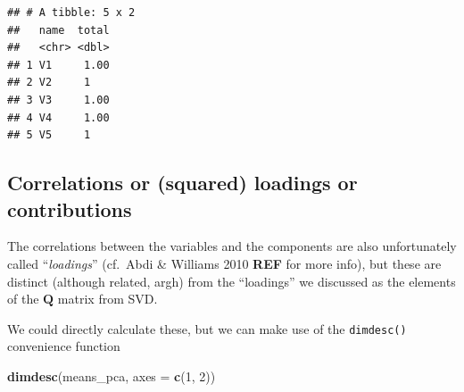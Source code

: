 \documentclass[
]{book}
\newenvironment{Shaded}{\begin{snugshade}}{\end{snugshade}}
\newcommand{\AttributeTok}[1]{\textcolor[rgb]{0.13,0.29,0.53}{#1}}
\newcommand{\CommentTok}[1]{\textcolor[rgb]{0.56,0.35,0.01}{\textit{#1}}}
\newcommand{\DecValTok}[1]{\textcolor[rgb]{0.00,0.00,0.81}{#1}}
\newcommand{\FunctionTok}[1]{\textcolor[rgb]{0.13,0.29,0.53}{\textbf{#1}}}
\newcommand{\NormalTok}[1]{#1}
\newcommand{\SpecialCharTok}[1]{\textcolor[rgb]{0.81,0.36,0.00}{\textbf{#1}}}
\begin{document}
\begin{Shaded}
\end{Shaded}

\begin{verbatim}
## # A tibble: 5 x 2
##   name  total
##   <chr> <dbl>
## 1 V1     1.00
## 2 V2     1   
## 3 V3     1.00
## 4 V4     1.00
## 5 V5     1
\end{verbatim}

\subsection{Correlations or (squared) loadings or contributions}\label{correlations-or-squared-loadings-or-contributions}

The correlations between the variables and the components are also unfortunately called ``\emph{loadings}'' (cf.~Abdi \& Williams 2010 \textbf{REF} for more info), but these are distinct (although related, argh) from the ``loadings'' we discussed as the elements of the \(\mathbf Q\) matrix from SVD.

We could directly calculate these, but we can make use of the \texttt{dimdesc()} convenience function

\begin{Shaded}
\begin{Highlighting}[]
\FunctionTok{dimdesc}\NormalTok{(means\_pca, }\AttributeTok{axes =} \FunctionTok{c}\NormalTok{(}\DecValTok{1}\NormalTok{, }\DecValTok{2}\NormalTok{))}
\end{Highlighting}
\end{Shaded}
\end{document}
